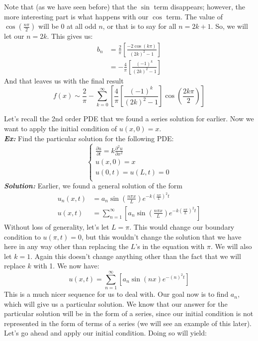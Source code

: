 \documentclass{article}
\begin{document}
\noindent Note that (as we have seen before) that the $\sin$ term disappears; however, the more interesting part is what happens with our $\cos$ term. The value of $\cos{\left(\frac{n\pi}{2}\right)}$ will be 0 at all odd $n$, or that is to say for all $n = 2k + 1$. So, we will let our $n = 2k$. This gives us:
\begin{align*}
b_{n} &= \frac{2}{\pi} \left[ \frac{-2 \cos{\left(k \pi \right)}}{(2k)^{2} - 1}\right]\\
&= -\frac{4}{\pi}\left[\frac{(-1)^{k}}{(2k)^{2}-1}\right]
\end{align*}
\noindent And that leaves us with the final result
\[
f(x)\sim \frac{2}{\pi} - \sum_{k=0}^{\infty}\left[\frac{4}{\pi}\left[\frac{(-1)^{k}}{(2k)^{2}-1}\right] \cos{\left(\frac{2k\pi}{2}\right)}\right]
\]
\newpage


\indent Let's recall the 2nd order PDE that we found a series solution for earlier. Now we want to apply the initial condition of $u(x,0) = x$.\\
\noindent\textbf{\textit{Ex:}} Find the particular solution for the following PDE:
\[
\begin{cases}
\frac{\partial u}{\partial t} = k \frac{\partial^{2} u}{\partial x^{2}}\\
u(x,0) = x\\
u(0,t) = u(L,t) = 0\\
\end{cases}
\]
\indent\textbf{\textit{Solution:}} Earlier, we found a general solution of the form
\begin{align*}
u_{n}(x,t) &= a_{n}\sin{\left(\frac{n\pi x}{L}\right)}e^{-k\left(\frac{n\pi}{L}\right)^{2}t}\\
u(x,t) &= \sum_{n = 1}^{\infty}\left[a_{n}\sin{\left(\frac{n\pi x}{L}\right)}e^{-k\left(\frac{n\pi}{L}\right)^{2}t}\right]
\end{align*}
\noindent Without loss of generality, let's let $L = \pi$. This would change our boundary condition to $u(\pi,t) = 0$, but this wouldn't change the solution that we have here in any way other than replacing the $L$'s in the equation with $\pi$. We will also let $k=1$. Again this doesn't change anything other than the fact that we will replace $k$ with 1. We now have:
\[
u(x,t) = \sum_{n = 1}^{\infty}\left[a_{n}\sin{\left(nx\right)}e^{-\left(n\right)^{2}t}\right]
\]
\noindent This is a much nicer sequence for us to deal with. Our goal now is to find $a_{n}$, which will give us a particular solution. We know that our answer for the particular solution will be in the form of a series, since our initial condition is not represented in the form of terms of a series (we will see an example of this later). Let's go ahead and apply our initial condition. Doing so will yield:
\end{document}
